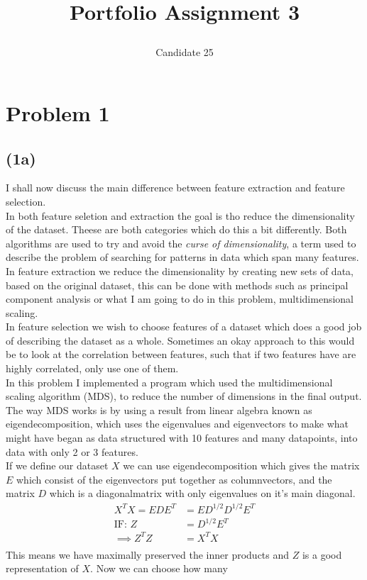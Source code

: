 \documentclass[12pt, letterpaper]{article}
\title{ \begin{huge}
\textbf{Portfolio Assignment 3}
\end{huge} }
\author{Candidate 25}
\date{}
\begin{document}
\maketitle
  \section*{Problem 1}
    \subsection*{(1a)}
      I shall now discuss the main difference between feature extraction and feature selection.\\

      In both feature seletion and extraction the goal is tho reduce the dimensionality of the dataset. Theese are both categories which do this a bit differently. Both algorithms are used to try and avoid the \textit{curse of dimensionality}, a term used to describe the problem of searching for patterns in data which span many features.\\

      In feature extraction we reduce the dimensionality by creating new sets of data, based on the original dataset, this can be done with methods such as principal component analysis or what I am going to do in this problem, multidimensional scaling.\\

      In feature selection we wish to choose features of a dataset which does a good job of describing the dataset as a whole. Sometimes an okay approach to this would be to look at the correlation between features, such that if two features have are highly correlated, only use one of them.\\

      In this problem I implemented a program which used the multidimensional scaling algorithm (MDS), to reduce the number of dimensions in the final output. The way MDS works is by using a result from linear algebra known as eigendecomposition, which uses the eigenvalues and eigenvectors to make what might have began as data structured with 10 features and many datapoints, into data with only 2 or 3 features.\\

      If we define our dataset $X$ we can use eigendecomposition which gives the matrix $E$ which consist of the eigenvectors put together as columnvectors, and the matrix $D$ which is a diagonalmatrix with only eigenvalues on it's main diagonal.
      \begin{align*}
        X^T X = EDE^T &= ED^{1/2}D^{1/2}E^T\\
        \text{IF: } Z &= D^{1/2}E^T\\
        \implies Z^T Z &= X^T X\\
      \end{align*}
      This means we have maximally preserved the inner products and $Z$ is a good representation of $X$. Now we can choose how many
\end{document}
